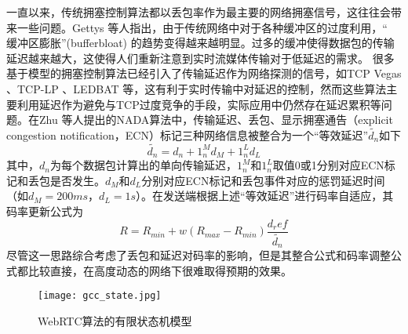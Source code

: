 一直以来，传统拥塞控制算法都以丢包率作为最主要的网络拥塞信号，这往往会带来一些问题。Gettys \cite{gettys2012bufferbloat} 等人指出，由于传统网络中对于各种缓冲区的过度利用，`` 缓冲区膨胀''(bufferbloat) 的趋势变得越来越明显。过多的缓冲使得数据包的传输延迟越来越大，这使得人们重新注意到实时流媒体传输对于低延迟的需求。
很多基于模型的拥塞控制算法已经引入了传输延迟作为网络探测的信号，如TCP Vegas \cite{brakmo1995tcp} 、TCP-LP \cite{kuzmanovic2003tcp}、LEDBAT \cite{shalunov2012low}等，这有利于实时传输中对延迟的控制，然而这些算法主要利用延迟作为避免与TCP过度竞争的手段，实际应用中仍然存在延迟累积等问题。在Zhu \cite{zhu2013nada} 等人提出的NADA算法中，传输延迟、丢包、显示拥塞通告（explicit congestion notification，ECN）标记三种网络信息被整合为一个``等效延迟''$\widetilde{d_n}$如下
\begin{equation}
  \widetilde{d_n} = d_n + 1_n^M d_M + 1_n^L d_L
\end{equation}
其中，$d_n$为每个数据包计算出的单向传输延迟，$1_n^M$和$1_n^L$取值0或1分别对应ECN标记和丢包是否发生。$d_M$和$d_L$分别对应ECN标记和丢包事件对应的惩罚延迟时间（如$d_M=200ms$，$d_L=1s$）。在发送端根据上述``等效延迟''进行码率自适应，其码率更新公式为
\begin{equation}
  R = R_{min} + w(R_{max} - R_{min}) \frac{d_ref}{\widetilde{d_n}}
\end{equation}
尽管这一思路综合考虑了丢包和延迟对码率的影响，但是其整合公式和码率调整公式都比较直接，在高度动态的网络下很难取得预期的效果。

\begin{figure}[htbp]
  \centering
  \texttt{[image: gcc\_state.jpg]}
  \caption{WebRTC算法的有限状态机模型}
  \label{fig:gcc_state}
\end{figure}

